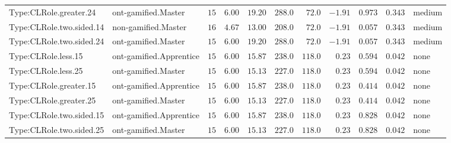 \documentclass[6pt,a4paper]{article}
\begin{document}
{\begin{longtable}{llrrrrrrrrl}
Type:CLRole.greater.24&ont-gamified.Master&$15$&$6.00$&$19.20$&$ 288.0$&$ 72.0$&$-1.91$&$0.973$&$0.343$&medium\tabularnewline
Type:CLRole.two.sided.14&non-gamified.Master&$16$&$4.67$&$13.00$&$ 208.0$&$ 72.0$&$-1.91$&$0.057$&$0.343$&medium\tabularnewline
Type:CLRole.two.sided.24&ont-gamified.Master&$15$&$6.00$&$19.20$&$ 288.0$&$ 72.0$&$-1.91$&$0.057$&$0.343$&medium\tabularnewline
Type:CLRole.less.15&ont-gamified.Apprentice&$15$&$6.00$&$15.87$&$ 238.0$&$118.0$&$ 0.23$&$0.594$&$0.042$&none\tabularnewline
Type:CLRole.less.25&ont-gamified.Master&$15$&$6.00$&$15.13$&$ 227.0$&$118.0$&$ 0.23$&$0.594$&$0.042$&none\tabularnewline
Type:CLRole.greater.15&ont-gamified.Apprentice&$15$&$6.00$&$15.87$&$ 238.0$&$118.0$&$ 0.23$&$0.414$&$0.042$&none\tabularnewline
Type:CLRole.greater.25&ont-gamified.Master&$15$&$6.00$&$15.13$&$ 227.0$&$118.0$&$ 0.23$&$0.414$&$0.042$&none\tabularnewline
\newpage
Type:CLRole.two.sided.15&ont-gamified.Apprentice&$15$&$6.00$&$15.87$&$ 238.0$&$118.0$&$ 0.23$&$0.828$&$0.042$&none\tabularnewline
Type:CLRole.two.sided.25&ont-gamified.Master&$15$&$6.00$&$15.13$&$ 227.0$&$118.0$&$ 0.23$&$0.828$&$0.042$&none\tabularnewline
\hline
\end{longtable}}
\end{document}
